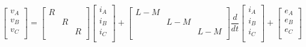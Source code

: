 \documentclass[fleqn]{article}
\begin{document}
\begin{flushleft}
\[
  \begin{bmatrix}
    v_A \\
    v_B \\
    v_C \\
  \end{bmatrix}
  =
  \begin{bmatrix}
    R &   &   \\
      & R &   \\
      &   & R \\
  \end{bmatrix}
  \begin{bmatrix}
    i_A \\
    i_B \\
    i_C \\
  \end{bmatrix}
  +
  \begin{bmatrix}
    L - M &       &       \\
          & L - M &       \\
          &       & L - M \\
  \end{bmatrix}
  \frac{d}{dt}
  \begin{bmatrix}
    i_A \\
    i_B \\
    i_C \\
  \end{bmatrix}
  +
  \begin{bmatrix}
    e_A \\
    e_B \\
    e_C \\
  \end{bmatrix}
\]


\end{flushleft}
\end{document}
